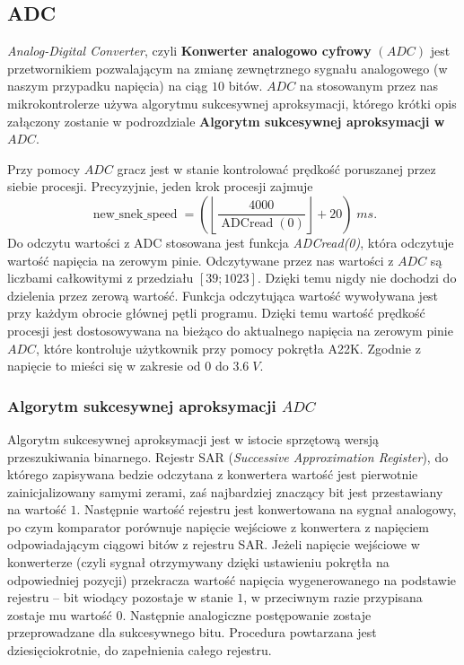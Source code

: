 \documentclass[a4paper,12pt,twoside]{article}
\theoremstyle{plain}
\theoremstyle{definition}
\theoremstyle{remark}
\begin{document}
\subsection{ADC}
\textit{Analog-Digital Converter}, czyli
\textbf{Konwerter analogowo cyfrowy} $(ADC)$ jest przetwornikiem pozwalającym na zmianę zewnętrznego sygnału analogowego (w naszym przypadku napięcia) na ciąg $10$ bitów. $ADC$ na stosowanym przez nas mikrokontrolerze używa algorytmu sukcesywnej aproksymacji, którego krótki opis załączony zostanie w podrozdziale \textbf{Algorytm sukcesywnej aproksymacji w $ADC$}.

Przy pomocy $ADC$ gracz jest w stanie kontrolować prędkość poruszanej przez siebie procesji. Precyzyjnie, jeden krok procesji zajmuje
\[
\operatorname{new\_snek\_speed} =\left( \left\lfloor \frac{4000}{ \operatorname{ADCread}(0)} \right\rfloor + 20 \right) \; ms.
\]
Do odczytu wartości z ADC stosowana jest funkcja \textit{ADCread(0)}, która odczytuje wartość napięcia na zerowym pinie.
Odczytywane przez nas wartości z $ADC$ są liczbami całkowitymi z przedziału $[39;1023]$. Dzięki temu nigdy nie dochodzi do dzielenia przez zerową wartość. Funkcja odczytująca wartość wywoływana jest przy każdym obrocie głównej pętli programu. Dzięki temu wartość prędkość procesji jest dostosowywana na bieżąco do aktualnego napięcia na zerowym pinie $ADC$, które kontroluje użytkownik przy pomocy pokrętła A22K. Zgodnie z \cite{INST} napięcie to mieści się w zakresie od $0$ do $3.6 \;V$. 

	\subsubsection{Algorytm sukcesywnej aproksymacji $ADC$ \cite{ADCINST}}
	Algorytm sukcesywnej aproksymacji jest w istocie sprzętową wersją przeszukiwania binarnego. Rejestr SAR (\textit{Successive Approximation Register}), do którego zapisywana bedzie odczytana z konwertera wartość jest pierwotnie zainicjalizowany samymi zerami, zaś najbardziej znaczący bit jest przestawiany na wartość $1$. Następnie wartość rejestru jest konwertowana na sygnał analogowy, po czym komparator porównuje napięcie wejściowe z konwertera z napięciem odpowiadającym ciągowi bitów z rejestru SAR. Jeżeli napięcie wejściowe w konwerterze (czyli sygnał otrzymywany dzięki ustawieniu pokrętła na odpowiedniej pozycji) przekracza wartość napięcia wygenerowanego na podstawie rejestru -- bit wiodący pozostaje w stanie $1$, w przeciwnym razie przypisana zostaje mu wartość $0$. Następnie analogiczne postępowanie zostaje przeprowadzane dla sukcesywnego bitu. Procedura powtarzana jest dziesięciokrotnie, do zapełnienia całego rejestru.
\end{document}
